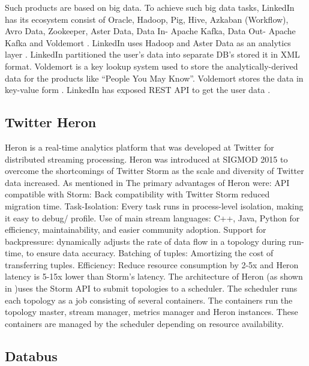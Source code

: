      Such products are based on big data. To achieve such big data
     tasks, LinkedIn has its ecosystem consist of Oracle, Hadoop, Pig,
     Hive, Azkaban (Workflow), Avro Data, Zookeeper, Aster Data,
     Data In- Apache Kafka, Data Out- Apache Kafka and Voldemort
     \cite{www-linkedinbigdata}. LinkedIn uses Hadoop and Aster Data
     as an analytics layer \cite{www-linkedinquora}. LinkedIn
     partitioned the user’s data into separate DB’s stored it in XML
     format. Voldemort is a key lookup system used to store the
     analytically-derived data for the products like ``People You
     May Know''. Voldemort stores the data in key-value form
     \cite{www-linkedinquora}. LinkedIn has exposed REST
     API to get the user data \cite{www-linkedindevelopers}.

\subsection{ Twitter Heron}

     Heron is a real-time analytics platform that was developed at
     Twitter for distributed streaming processing. Heron was
     introduced at SIGMOD 2015 to overcome the shortcomings of Twitter
     Storm as the scale and diversity of Twitter data increased. As
     mentioned in \cite{www-TwitterHeronOpen} The primary advantages
     of Heron were: API compatible with Storm: Back compatibility with
     Twitter Storm reduced migration time. Task-Isolation: Every task
     runs in process-level isolation, making it easy to debug/
     profile. Use of main stream languages: C++, Java, Python for
     efficiency, maintainability, and easier community
     adoption. Support for backpressure: dynamically adjusts the rate
     of data flow in a topology during run-time, to ensure data
     accuracy. Batching of tuples: Amortizing the cost of transferring
     tuples. Efficiency: Reduce resource consumption by 2-5x and Heron
     latency is 5-15x lower than Storm’s latency. The architecture of
     Heron (as shown in \cite{www-TwitterHeron})uses the Storm API to
     submit topologies to a scheduler. The scheduler runs each
     topology as a job consisting of several containers. The
     containers run the topology master, stream manager, metrics
     manager and Heron instances. These containers are managed by the
     scheduler depending on resource availability.
     
\subsection{ Databus}
